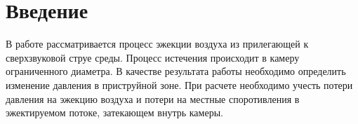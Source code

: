\chapter{Введение}

В работе рассматривается процесс эжекции воздуха из прилегающей к сверхзвуковой струе среды. Процесс истечения происходит в камеру ограниченного диаметра. В качестве результата работы необходимо определить изменение давления в приструйной зоне. При расчете необходимо учесть потери давления на эжекцию воздуха и потери на местные споротивления в эжектируемом потоке, затекающем внутрь камеры.